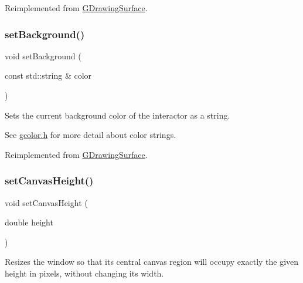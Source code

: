 Reimplemented from \mbox{\hyperlink{classGDrawingSurface_aba673fd56570a074aba10fa059524b96}{G\+Drawing\+Surface}}.

\mbox{\label{classGWindow_a222fcfb542aa6094c7e0de671bd69627}} 
\subsubsection{\texorpdfstring{set\+Background()}{setBackground()}\hspace{0.1cm}{\footnotesize\ttfamily [2/2]}}
{\footnotesize\ttfamily void set\+Background (\begin{DoxyParamCaption}\item[{const std\+::string \&}]{color }\end{DoxyParamCaption})\hspace{0.3cm}{\ttfamily [virtual]}}



Sets the current background color of the interactor as a string. 

See \mbox{\hyperlink{gcolor_8h_source}{gcolor.\+h}} for more detail about color strings. 

Reimplemented from \mbox{\hyperlink{classGDrawingSurface_ab4677ab2474e68b07aa56605af92a84a}{G\+Drawing\+Surface}}.

\mbox{\label{classGWindow_a059f69fab57ad2cca2243c5a64f7306d}} 
\subsubsection{\texorpdfstring{set\+Canvas\+Height()}{setCanvasHeight()}}
{\footnotesize\ttfamily void set\+Canvas\+Height (\begin{DoxyParamCaption}\item[{double}]{height }\end{DoxyParamCaption})\hspace{0.3cm}{\ttfamily [virtual]}}



Resizes the window so that its central canvas region will occupy exactly the given height in pixels, without changing its width. 

\mbox{\label{classGWindow_a06022723e253be88ca7e48034ff66244}} 
